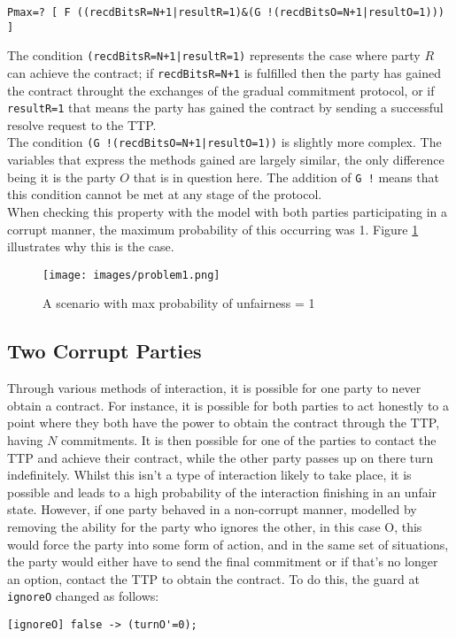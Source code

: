 \documentclass{l4proj}
\begin{document}
\begin{lstlisting}
Pmax=? [ F ((recdBitsR=N+1|resultR=1)&(G !(recdBitsO=N+1|resultO=1))) ]
\end{lstlisting}

The condition {\tt (recdBitsR=N+1|resultR=1)} represents the case where party $R$ can achieve the contract; if {\tt recdBitsR=N+1} is fulfilled then the party has gained the contract throught the exchanges of the gradual commitment protocol, or if {\tt resultR=1} that means the party has gained the contract by sending a successful resolve request to the TTP. \\
The condition {\tt (G !(recdBitsO=N+1|resultO=1))} is slightly more complex. The variables that express the methods gained are largely similar, the only difference being it is the party $O$ that is in question here. The addition of {\tt G !} means that this condition cannot be met at any stage of the protocol.\\
When checking this property with the model with both parties participating in a corrupt manner, the maximum probability of this occurring was 1. Figure \ref{problem1} illustrates why this is the case.

\begin{figure}[ht!]
\centering
\texttt{[image: images/problem1.png]}
\caption{A scenario with max probability of unfairness = 1}
\label{problem1}
\end{figure}

\subsection{Two Corrupt Parties}

Through various methods of interaction, it is possible for one party to never obtain a contract. For instance, it is possible for both parties to act honestly to a point where they both have the power to obtain the contract through the TTP, having $N$ commitments. It is then possible for one of the parties to contact the TTP and achieve their contract, while the other party passes up on there turn indefinitely. Whilst this isn't a type of interaction likely to take place, it is possible and leads to a high probability of the interaction finishing in an unfair state. However, if one party behaved in a non-corrupt manner, modelled by removing the ability for the party who ignores the other, in this case O, this would force the party into some form of action, and in the same set of situations, the party would either have to send the final commitment or if that's no longer an option, contact the TTP to obtain the contract. To do this, the guard at {\tt ignoreO} changed as follows:
\begin{verbatim}
[ignoreO] false -> (turnO'=0);
\end{verbatim}
\end{document}
